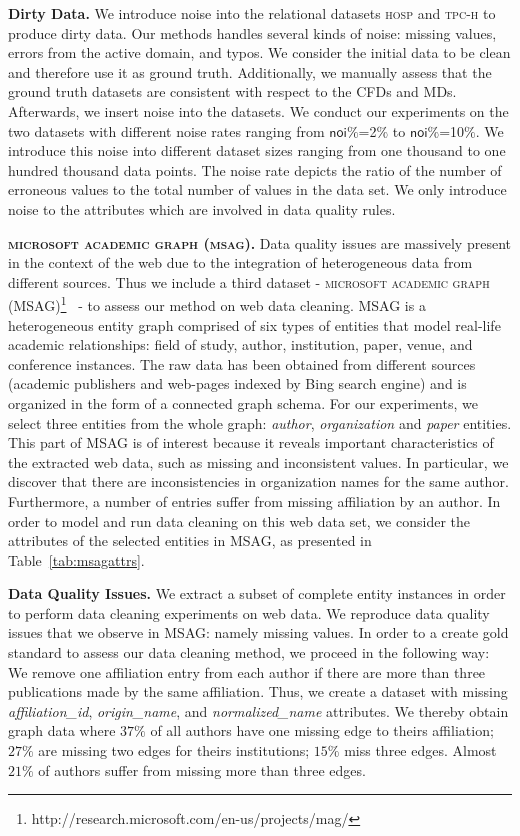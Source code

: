 \textbf{Dirty Data.} We introduce noise into the relational datasets \textsc{hosp} and \textsc{tpc-h} to produce dirty data. Our methods handles several kinds of noise: missing values, errors from the active domain, and typos. We consider the initial data to be clean and therefore use it as ground truth. Additionally, we manually assess that the ground truth datasets are consistent with respect to the CFDs and MDs. Afterwards, we insert noise into the datasets. We conduct our experiments on the two datasets with different noise rates ranging from $\mathsf{noi\%}$=2$\%$ to $\mathsf{noi\%}$=10$\%$. We introduce this noise into different dataset sizes ranging from one thousand to one hundred thousand data points. The noise rate depicts the ratio of the number of erroneous values to the total number of values in the data set. We only introduce noise to the attributes which are involved in data quality rules.

\textbf{\textsc{microsoft academic graph (msag)}.} Data quality issues are massively present in the context of the web due to the integration of heterogeneous data from different sources. Thus we include a third dataset - \textsc{microsoft academic graph (MSAG)}\footnote{http://research.microsoft.com/en-us/projects/mag/}~\cite{msag2015} - to assess our method on web data cleaning. MSAG is a heterogeneous entity graph comprised of six types of entities that model real-life academic relationships: field of study, author, institution, paper, venue, and conference instances. The raw data has been obtained from different sources (academic publishers and web-pages indexed by Bing search engine) and is organized in the form of a connected graph schema. For our experiments, we select three entities from the whole graph: \textit{author}, \textit{organization} and \textit{paper} entities. This part of \textsc{MSAG} is of interest because it reveals important characteristics of the extracted web data, such as missing and inconsistent values. In particular, we discover that there are inconsistencies in organization names for the same author. Furthermore, a number of entries suffer from missing affiliation by an author. In order to model and run data cleaning on this web data set, we consider the attributes of the selected entities in \textsc{MSAG}, as presented in Table~\ref{tab:msagattrs}. 

\textbf{Data Quality Issues.} We extract a subset of complete entity instances in order to perform data cleaning experiments on web data. We reproduce data quality issues that we observe in \textsc{MSAG}: namely missing values. In order to a create gold standard to assess our data cleaning method, we proceed in the following way: We remove one affiliation entry from each author if there are more than three publications made by the same affiliation. Thus, we create a dataset with missing \textsl{affiliation\_id}, \textsl{origin\_name}, and \textsl{normalized\_name} attributes. We thereby obtain graph data where $37\%$ of all authors have one missing edge to theirs affiliation; $27\%$ are missing two edges for theirs institutions; $15\%$ miss three edges. Almost $21\%$ of authors suffer from missing more than three edges. 

